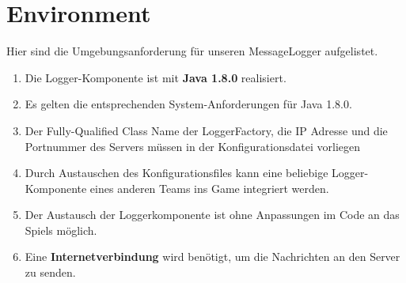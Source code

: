 \documentclass[12pt,a4paper,twosided]{scrartcl}
\begin{document}
\section{Environment}
Hier sind die Umgebungsanforderung für unseren MessageLogger aufgelistet.

\begin{enumerate}
	\item Die Logger-Komponente ist mit \textbf{Java 1.8.0} realisiert.
	\item Es gelten die entsprechenden System-Anforderungen für Java 1.8.0.
	\item Der Fully-Qualified Class Name der LoggerFactory, die IP Adresse und die Portnummer des Servers müssen in der Konfigurationsdatei vorliegen
	\item Durch Austauschen des Konfigurationsfiles kann eine beliebige Logger-Komponente eines anderen Teams ins Game integriert werden.
	\item Der Austausch der Loggerkomponente ist ohne Anpassungen im Code an das Spiels möglich.
	\item Eine \textbf{Internetverbindung} wird benötigt, um die Nachrichten an den Server zu senden.
\end{enumerate}
\end{document}
